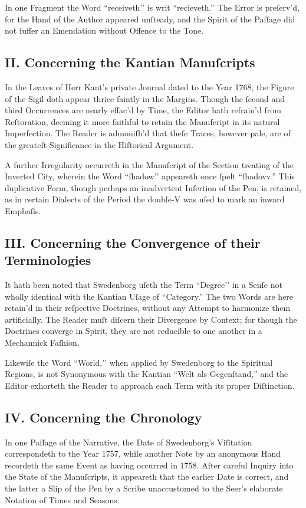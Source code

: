 \documentclass[12pt]{article}
\begin{document}
In one Fragment the Word ``receiveth’’ is writ ``recieveth.’’ The Error is 
preſerv’d, for the Hand of the Author appeared unſteady, and the Spirit of 
the Paſſage did not ſuffer an Emendation without Offence to the Tone.

\subsection*{II. Concerning the Kantian Manuſcripts}
In the Leaves of Herr Kant’s private Journal dated to the Year 1768, the 
Figure of the Sigil doth appear thrice faintly in the Margins. Though the 
ſecond and third Occurrences are nearly effac’d by Time, the Editor hath 
refrain’d from Reſtoration, deeming it more faithful to retain the Manufcript 
in its natural Imperfection. The Reader is admoniſh’d that theſe Traces, 
however pale, are of the greateſt Significance in the Hiſtorical Argument.

A further Irregularity occurreth in the Manuſcript of the Section 
treating of the Inverted City, wherein the Word ``ſhadow’’ appeareth once 
ſpelt ``ſhadovv.'' This duplicative Form, though perhaps an inadvertent 
Inſertion of the Pen, is retained, as in certain Dialects of the Period the 
double-V was uſed to mark an inward Emphaſis.

\subsection*{III. Concerning the Convergence of their Terminologies}
It hath been noted that Swedenborg uſeth the Term ``Degree’’ in a Senſe not 
wholly identical with the Kantian Uſage of ``Category.'' The two Words are 
here retain’d in their reſpective Doctrines, without any Attempt to 
harmonize them artificially. The Reader muſt diſcern their Divergence by 
Context; for though the Doctrines converge in Spirit, they are not reducible 
to one another in a Mechannick Faſhion.

Likewiſe the Word ``World,’’ when applied by Swedenborg to the Spiritual 
Regions, is not Synonymous with the Kantian ``Welt als Gegenſtand,'' and the 
Editor exhorteth the Reader to approach each Term with its proper Diſtinction.

\subsection*{IV. Concerning the Chronology}
In one Paſſage of the Narrative, the Date of Swedenborg's Viſitation correspondeth 
to the Year 1757, while another Note by an anonymous Hand recordeth the same Event 
as having occurred in 1758. After careful Inquiry into the State of the 
Manuſcripts, it appeareth that the earlier Date is correct, and the latter 
a Slip of the Pen by a Scribe unaccustomed to the Seer's elaborate Notation 
of Times and Seasons.
\end{document}

